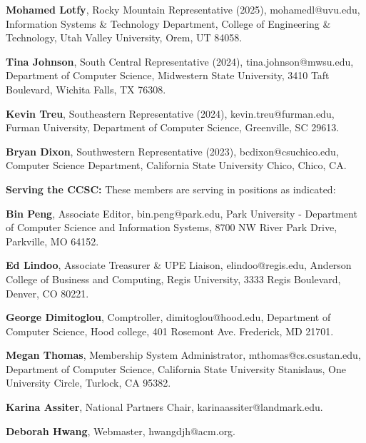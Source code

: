 \documentclass{article}
\begin{document}
\begin{multicols}{2}
\begin{raggedright}
{\noindent
\textbf{Mohamed Lotfy}, Rocky Mountain Representative (2025),
mohamedl@uvu.edu, Information Systems \& Technology Department,
College of Engineering \& Technology, Utah Valley University, Orem, UT 84058.

\noindent
\textbf{Tina Johnson}, South Central Representative (2024),
tina.johnson@mwsu.edu, Department of Computer Science, Midwestern State University,
3410 Taft Boulevard, Wichita Falls, TX 76308.

\noindent
\textbf{Kevin Treu}, Southeastern Representative (2024),
kevin.treu@furman.edu, Furman University, Department of Computer Science, Greenville,
SC 29613.

\noindent
\textbf{Bryan Dixon}, Southwestern Representative (2023),
bcdixon@csuchico.edu, Computer Science Department, California State University Chico, Chico, CA.
}
\end{raggedright}
\end{multicols}

\clearpage

\begin{multicols}{2}
\begin{raggedright}

\small{
\vspace{0.2in}
\noindent
\textbf{Serving the CCSC:} These members are serving in positions as indicated:

\noindent
\textbf{Bin Peng}, Associate Editor,
bin.peng@park.edu, Park University - Department of Computer Science and
Information Systems, 8700 NW River Park Drive, Parkville, MO 64152.

\noindent
\textbf{Ed Lindoo}, Associate Treasurer \& UPE Liaison, elindoo@regis.edu,
Anderson College of Business and Computing, Regis University, 3333 Regis Boulevard, Denver, CO 80221.

\noindent
\textbf{George Dimitoglou}, Comptroller,
dimitoglou@hood.edu,
Department of Computer Science, Hood college,
401 Rosemont Ave. Frederick, MD 21701.

\noindent
\textbf{Megan Thomas}, Membership System Administrator,
mthomas@cs.csustan.edu, Department of Computer Science, California State University Stanislaus,
One University Circle, Turlock, CA 95382.

\noindent
\textbf{Karina Assiter}, National Partners Chair, karinaassiter@landmark.edu.

\noindent
\textbf{Deborah Hwang}, Webmaster, hwangdjh@acm.org.
}
\end{raggedright}
\end{multicols}
\end{document}

